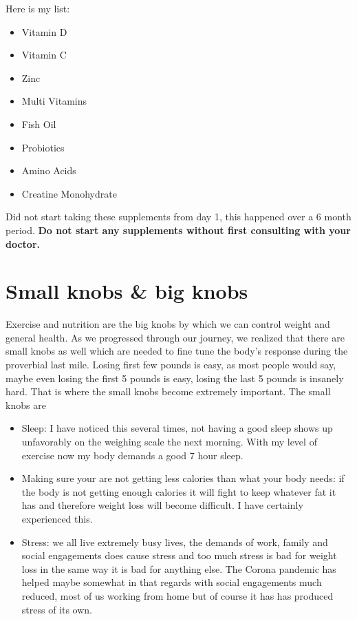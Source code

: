 \documentclass[
  oneside]{book}
\providecommand{\tightlist}{%
  \setlength{\itemsep}{0pt}\setlength{\parskip}{0pt}}
\begin{document}
Here is my list:

\begin{itemize}
\tightlist
\item
  Vitamin D
\item
  Vitamin C
\item
  Zinc
\item
  Multi Vitamins
\item
  Fish Oil
\item
  Probiotics
\item
  Amino Acids
\item
  Creatine Monohydrate
\end{itemize}

Did not start taking these supplements from day 1, this happened over a 6 month period. \textbf{Do not start any supplements without first consulting with your doctor.}

\hypertarget{small-knobs-big-knobs}{%
\section{Small knobs \& big knobs}\label{small-knobs-big-knobs}}

Exercise and nutrition are the big knobs by which we can control weight and general health. As we progressed through our journey, we realized that there are small knobs as well which are needed to fine tune the body's response during the proverbial last mile. Losing first few pounds is easy, as most people would say, maybe even losing the first 5 pounds is easy, losing the last 5 pounds is insanely hard. That is where the small knobs become extremely important. The small knobs are

\begin{itemize}
\item
  Sleep: I have noticed this several times, not having a good sleep shows up unfavorably on the weighing scale the next morning. With my level of exercise now my body demands a good 7 hour sleep.
\item
  Making sure your are not getting less calories than what your body needs: if the body is not getting enough calories it will fight to keep whatever fat it has and therefore weight loss will become difficult. I have certainly experienced this.
\item
  Stress: we all live extremely busy lives, the demands of work, family and social engagements does cause stress and too much stress is bad for weight loss in the same way it is bad for anything else. The Corona pandemic has helped maybe somewhat in that regards with social engagements much reduced, most of us working from home but of course it has has produced stress of its own.
\end{itemize}
\end{document}
